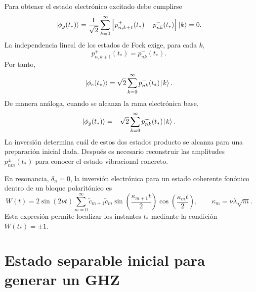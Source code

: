 Para obtener el estado electr\'onico excitado debe cumplirse
\begin{equation}
  \ket{\phi_g(t_*)}
  =
  \frac{1}{\sqrt2}
  \sum_{k=0}^{\infty}
  \left[
  p_{n,k+1}^{+}(t_*)-p_{nk}^{-}(t_*)
  \right]\ket k
  =0.
\end{equation}
La independencia lineal de los estados de Fock exige, para cada $k$,
\begin{equation}
  p_{n,k+1}^{+}(t_*)=p_{nk}^{-}(t_*).
\end{equation}
Por tanto,
\begin{equation}
  \ket{\phi_e(t_*)}
  =
  \sqrt2
  \sum_{k=0}^{\infty}p_{nk}^{-}(t_*)\ket k.
\end{equation}
De manera an\'aloga, cuando se alcanza la rama electr\'onica base,
\begin{equation}
  \ket{\phi_g(t_*)}
  =
  -\sqrt2
  \sum_{k=0}^{\infty}p_{nk}^{-}(t_*)\ket k.
\end{equation}
La inversi\'on determina cu\'al de estos dos estados producto se alcanza para
una preparaci\'on inicial dada. Despu\'es es necesario reconstruir las
amplitudes $p_{nm}^{\pm}(t_*)$ para conocer el estado vibracional concreto.

En resonancia, $\delta_n=0$, la inversi\'on electr\'onica para un estado
coherente fon\'onico dentro de un bloque polarit\'onico es
\begin{equation}
  \boxed{
  W(t)
  =
  2\sin(2\nu t)
  \sum_{m=0}^{\infty}
  \tilde c_{m+1}\tilde c_m
  \sin\left(\frac{\kappa_{m+1}t}{2}\right)
  \cos\left(\frac{\kappa_mt}{2}\right),
  \qquad
  \kappa_m=\nu\lambda\sqrt m.
  }
\end{equation}
Esta expresi\'on permite localizar los instantes $t_*$ mediante la condici\'on
$W(t_*)=\pm1$.

\section{Estado separable inicial para generar un GHZ}

